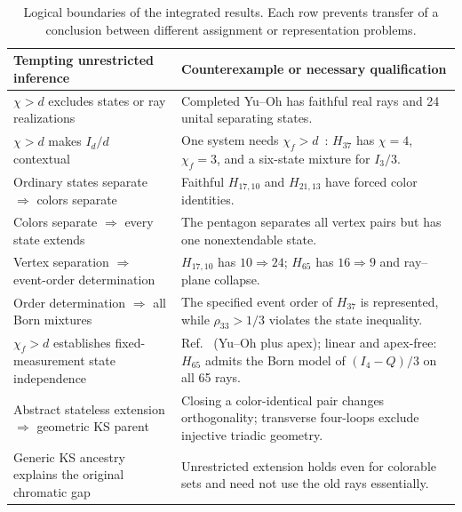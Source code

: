 \documentclass[aps,pra,reprint,superscriptaddress,longbibliography,nofootinbib,floatfix,10pt]{revtex4-2}
\theoremstyle{definition}\newtheorem{definition}[theorem]{Definition}
\theoremstyle{remark}\newtheorem{remark}[theorem]{Remark}
\begin{document}
\begin{table}[t]
\centering\small\setlength{\tabcolsep}{4pt}
\caption{Logical boundaries of the integrated results. Each row prevents transfer of a conclusion between different assignment or representation problems.}\label{tab:logical-boundaries}
\begin{tabular}{p{}p{}}\toprule
Tempting unrestricted inference & Counterexample or necessary qualification\\\midrule
$\chi>d$ excludes states or ray realizations & Completed Yu--Oh has faithful real rays and 24 unital separating states.\\
$\chi>d$ makes $I_d/d$ contextual~\cite{cabello2012maxnonlocality} & One system needs $\chi_f>d$~\cite{ramanathan2014sic}: $H_{37}$ has $\chi=4$, $\chi_f=3$, and a six-state mixture for $I_3/3$.\\
Ordinary states separate $\Rightarrow$ colors separate & Faithful $H_{17,10}$ and $H_{21,13}$ have forced color identities.\\
Colors separate $\Rightarrow$ every state extends & The pentagon separates all vertex pairs but has one nonextendable state.\\
Vertex separation $\Rightarrow$ event-order determination & $H_{17,10}$ has $10\Rightarrow24$; $H_{65}$ has $16\Rightarrow9$ and ray--plane collapse.\\
Order determination $\Rightarrow$ all Born mixtures & The specified event order of $H_{37}$ is represented, while $\rho_{33}>1/3$ violates the state inequality.\\
$\chi_f>d$ establishes fixed-measurement state independence & Ref.~\cite[Thm.~1]{cabello2015sic} (Yu--Oh plus apex); linear and apex-free: $H_{65}$ admits the Born model of $(I_4-Q)/3$ on all 65 rays.\\
Abstract stateless extension $\Rightarrow$ geometric KS parent & Closing a color-identical pair changes orthogonality; transverse four-loops exclude injective triadic geometry.\\
Generic KS ancestry explains the original chromatic gap & Unrestricted extension holds even for colorable sets and need not use the old rays essentially.\\\bottomrule
\end{tabular}
\end{table}
\end{document}
